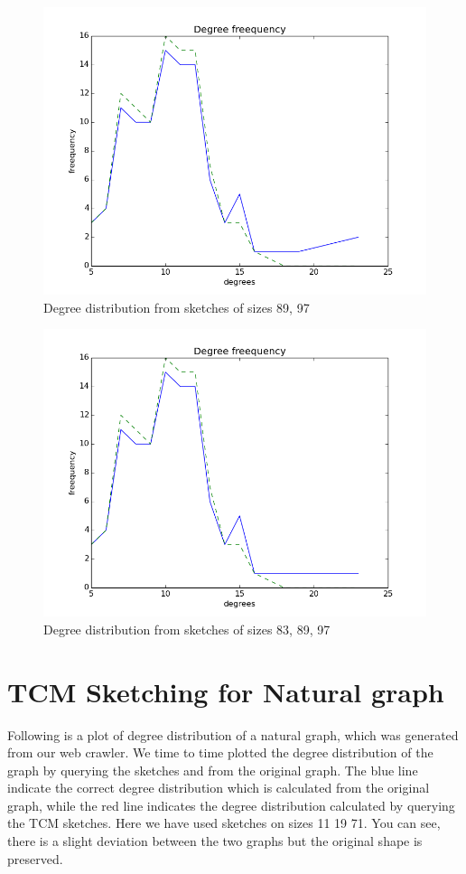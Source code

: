 \documentclass[12pt]{report}
\numberwithin{figure}{section}
\numberwithin{table}{section}
\begin{document}
\begin{figure}[H]
\centering
\includegraphics[scale=0.8]{images/dd2}
\caption{Degree distribution from sketches of sizes 89, 97}
\end{figure}

\begin{figure}[H]
\centering
\includegraphics[scale=0.8]{images/dd3}
\caption{Degree distribution from sketches of sizes 83, 89, 97}
\end{figure}

\section{TCM Sketching for Natural graph}
Following is a plot of degree distribution of a natural graph, which was generated from our web crawler. We time to time plotted the degree distribution of the graph by querying the sketches and from the original graph. The blue line indicate the correct degree distribution which is calculated from the original graph, while the red line indicates the degree distribution calculated by querying the TCM sketches. Here we have used sketches on sizes 11 19 71. You can see, there is a slight deviation between the two graphs but the original shape is preserved.
\end{document}
